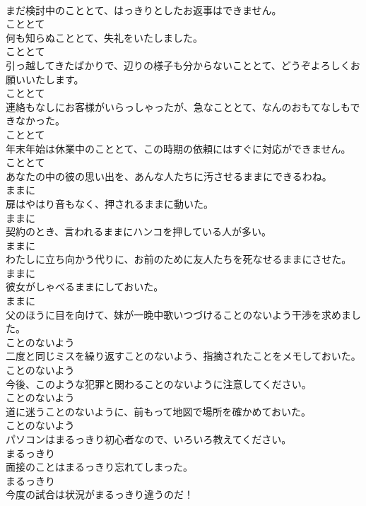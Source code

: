 \documentclass[8pt]{extreport}
\begin{document}
\begin{CJK}{UTF8}{min}
\\	まだ検討中のこととて、はっきりとしたお返事はできません。	
\\	こととて	
\\	何も知らぬこととて、失礼をいたしました。	
\\	こととて	
\\	引っ越してきたばかりで、辺りの様子も分からないこととて、どうぞよろしくお願いいたします。	
\\	こととて	
\\	連絡もなしにお客様がいらっしゃったが、急なこととて、なんのおもてなしもできなかった。	
\\	こととて	
\\	年末年始は休業中のこととて、この時期の依頼にはすぐに対応ができません。	
\\	こととて	
\\	あなたの中の彼の思い出を、あんな人たちに汚させるままにできるわね。	
\\	ままに	
\\	扉はやはり音もなく、押されるままに動いた。	
\\	ままに	
\\	契約のとき、言われるままにハンコを押している人が多い。	
\\	ままに	
\\	わたしに立ち向かう代りに、お前のために友人たちを死なせるままにさせた。	
\\	ままに	
\\	彼女がしゃべるままにしておいた。	
\\	ままに	
\\	父のほうに目を向けて、妹が一晩中歌いつづけることのないよう干渉を求めました。	
\\	ことのないよう	
\\	二度と同じミスを繰り返すことのないよう、指摘されたことをメモしておいた。	
\\	ことのないよう	
\\	今後、このような犯罪と関わることのないように注意してください。	
\\	ことのないよう	
\\	道に迷うことのないように、前もって地図で場所を確かめておいた。	
\\	ことのないよう	
\\	パソコンはまるっきり初心者なので、いろいろ教えてください。	
\\	まるっきり	
\\	面接のことはまるっきり忘れてしまった。	
\\	まるっきり	
\\	今度の試合は状況がまるっきり違うのだ！	

\end{CJK}
\end{document}
